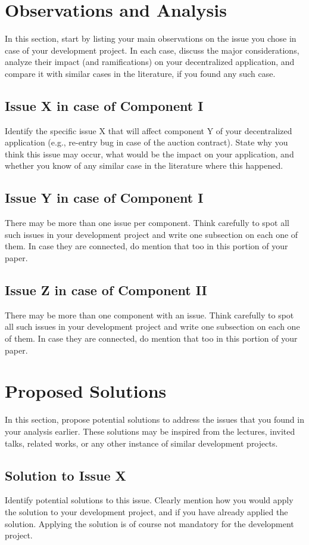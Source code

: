 \documentclass[conference]{IEEEtran}
\begin{document}
\section{Observations and Analysis}
In this section, start by listing your main observations on the issue you chose in case of your development project. In each case, discuss the major considerations, analyze their impact (and ramifications) on your decentralized application, and compare it with similar cases in the literature, if you found any such case.

\subsection{Issue X in case of Component I}
Identify the specific issue X that will affect component Y of your decentralized application (e.g., re-entry bug in case of the auction contract). State why you think this issue may occur, what would be the impact on your application, and whether you know of any similar case in the literature where this happened.

\subsection{Issue Y in case of Component I}
There may be more than one issue per component. Think carefully to spot all such issues in your development project and write one subsection on each one of them. In case they are connected, do mention that too in this portion of your paper.

\subsection{Issue Z in case of Component II}
There may be more than one component with an issue. Think carefully to spot all such issues in your development project and write one subsection on each one of them. In case they are connected, do mention that too in this portion of your paper.

\section{Proposed Solutions}
In this section, propose potential solutions to address the issues that you found in your analysis earlier. These solutions may be inspired from the lectures, invited talks, related works, or any other instance of similar development projects. 

\subsection{Solution to Issue X}
Identify potential solutions to this issue. Clearly mention how you would apply the solution to your development project, and if you have already applied the solution. Applying the solution is of course not mandatory for the development project.
\end{document}
